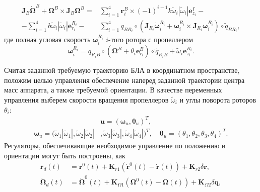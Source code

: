 \begin{equation} \label{eq:m_final_rotational_motion}
\begin{aligned}
\bm{J}_B\dot{\bm{\Omega}}^B + \bm{\Omega}^B \times \bm{J}_B{\bm{\Omega}^B} =
&\sum_{i=1}^{4} {\bm{r}^B_i \times
	(-1)^{i+1} k \tilde \omega_i |\tilde \omega_i| \bm{e}^I_{z_i}} - \\
-\sum_{i=1}^{4} {b \tilde \omega_i |\tilde \omega_i| \bm e^{R_i}_{r_i}} -
&\sum_{i=1}^{4} q_{ B {R_i}} \circ (\bm{J}_{R_i}\dot{\bm{\omega}}^{R_i}_i + \bm{\omega}^{R_i}_i \times \bm{J}_{R_i}{\bm{\omega}^{R_i}_i}) \circ \tilde q_{ B {R_i}}
,
\end{aligned}
\end{equation}
где полная угловая скорость $\bm{\omega}^{R_i}_i$ $i$-того ротора с пропеллером
\begin{equation} \label{eq:m_prop_ang_vel}
\bm{\omega}^{R_i}_i =
q_{{R_i} B} \circ (\bm{\Omega}^B + \dot {\theta}_i \bm e^B_{r_i}) \circ \tilde {q}_{{R_i}B} +
\tilde \omega_i \bm{e}^{R_i}_{z_i}
.
\end{equation}

Считая заданной требуемую траекторию БЛА в координатном пространстве, положим целью управления обеспечение наперед заданной траектории центра масс аппарата, а также требуемой ориентации. В качестве переменных управления выберем скорости вращения пропеллеров ${\tilde \omega}_i$ и углы поворота роторов ${\theta}_i$:
\begin{equation} \label{eq:m_ctrl_out}
\begin{aligned}
&\bm{u} = (\bm \omega_u, \bm \theta_u)^T,
\\
\bm \omega_u =
(\tilde\omega_1 |\tilde\omega_1|,
\tilde\omega_2 |\tilde\omega_2|&,
\tilde\omega_3 |\tilde\omega_3|,
\tilde\omega_4 |\tilde\omega_4|)^T,
\quad
\bm \theta_u = (\theta_1, \theta_2 , \theta_3 , \theta_4 )^T.
\end{aligned}
\end{equation}
Регуляторы, обеспечивающие необходимое управление по положению и ориентации могут быть построены, как
\begin{equation} \label{eq:m_reg}
\begin{aligned}
\ddot{\bm{r}_d}(t)&=
\ddot{\bm{r}}^0(t)+\bm{K}_{r1}(\dot{\bm{r}}^0(t) - \dot{\bm{r}}(t))+\bm{K}_{r2}\delta \bm r,\\
\dot{\bm{\Omega}}_d(t)&=
\dot{\bm{\Omega}}^0(t)+\bm{K}_{\Omega1}(\bm{\Omega}^0(t)-\bm{\Omega}(t))+\bm{K}_{\Omega2}\delta\bm{q},
\end{aligned}
\end{equation}

